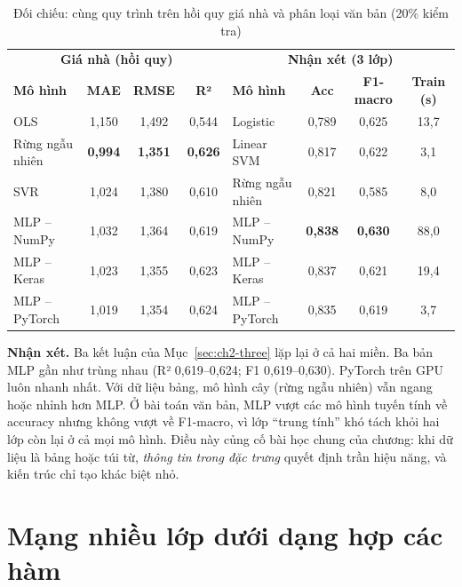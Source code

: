\begin{table}[H]
\centering
\caption{Đối chiếu: cùng quy trình trên hồi quy giá nhà và phân loại văn bản (20\% kiểm tra)}
\label{tab:ch2-domains}
\small
\begin{tabular}{@{}lccc|lccc@{}}
\toprule
\multicolumn{4}{c|}{\textbf{Giá nhà (hồi quy)}} & \multicolumn{4}{c}{\textbf{Nhận xét (3 lớp)}} \\
\textbf{Mô hình} & \textbf{MAE} & \textbf{RMSE} & \textbf{R²} & \textbf{Mô hình} & \textbf{Acc} & \textbf{F1-macro} & \textbf{Train (s)} \\
\midrule
OLS & 1,150 & 1,492 & 0,544 & Logistic & 0,789 & 0,625 & 13,7 \\
Rừng ngẫu nhiên & \textbf{0,994} & \textbf{1,351} & \textbf{0,626} & Linear SVM & 0,817 & 0,622 & 3,1 \\
SVR & 1,024 & 1,380 & 0,610 & Rừng ngẫu nhiên & 0,821 & 0,585 & 8,0 \\
MLP – NumPy & 1,032 & 1,364 & 0,619 & MLP – NumPy & \textbf{0,838} & \textbf{0,630} & 88,0 \\
MLP – Keras & 1,023 & 1,355 & 0,623 & MLP – Keras & 0,837 & 0,621 & 19,4 \\
MLP – PyTorch & 1,019 & 1,354 & 0,624 & MLP – PyTorch & 0,835 & 0,619 & 3,7 \\
\bottomrule
\end{tabular}
\end{table}

\textbf{Nhận xét.} Ba kết luận của Mục~\ref{sec:ch2-three} lặp lại ở cả hai miền. Ba bản MLP gần như trùng nhau (R² 0,619–0,624; F1 0,619–0,630). PyTorch trên GPU luôn nhanh nhất. Với dữ liệu bảng, mô hình cây (rừng ngẫu nhiên) vẫn ngang hoặc nhỉnh hơn MLP. Ở bài toán văn bản, MLP vượt các mô hình tuyến tính về accuracy nhưng không vượt về F1-macro, vì lớp ``trung tính'' khó tách khỏi hai lớp còn lại ở cả mọi mô hình. Điều này củng cố bài học chung của chương: khi dữ liệu là bảng hoặc túi từ, \emph{thông tin trong đặc trưng} quyết định trần hiệu năng, và kiến trúc chỉ tạo khác biệt nhỏ.

\section{Mạng nhiều lớp dưới dạng hợp các hàm}
\label{sec:ch2-compose}

